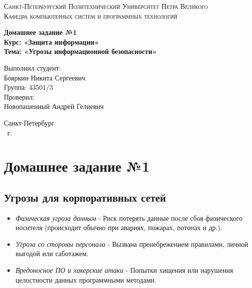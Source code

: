 \documentclass[14pt,a4paper,report]{report}
\begin{document}
\def\contentsname{Содержание}

\begin{titlepage}
	\begin{center}
		\textsc{Санкт-Петербургский Политехнический 
			Университет Петра Великого\\[5mm]
			Кафедра компьютерных систем и программных технологий}
		
		\vfill
		
		\textbf{Домашнее задание №1\\[3mm]
			Курс: «Защита информации»\\[6mm]
			Тема: «Угрозы информационной безопасности»\\[35mm]
		}
	\end{center}
	
	\hfill
	\begin{minipage}{.5\textwidth}
		Выполнил студент:\\[2mm] 
		Бояркин Никита Сергеевич\\
		Группа: 43501/3\\[5mm]
		
		Проверил:\\[2mm] 
		Новопашенный Андрей Гелиевич
	\end{minipage}
	\vfill
	\begin{center}
		Санкт-Петербург\\ \the\year\ г.
	\end{center}
\end{titlepage}

\chapter{Домашнее задание №1}

\section{Угрозы для корпоративных сетей}

\begin{itemize}
	\item \emph{Физическая угроза данным} - Риск потерять данные после сбоя физического носителя (происходит обычно при авариях, пожарах, потопах и др.).
	\item \emph{Угроза со стороны персонала} - Вызвана пренебрежением правилами, личной выгодой или саботажем.
	\item \emph{Вредоносное ПО и хакерские атаки} - Попытки хищения или нарушения целостности данных программными методами.
\end{itemize}
\end{document}
